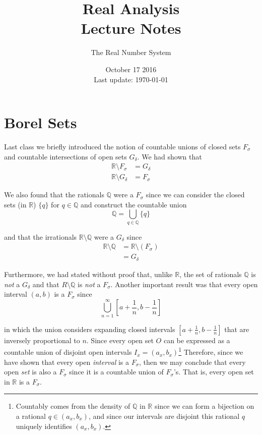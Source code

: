 \documentclass[12pt]{article}
\newlength\tindent
\renewcommand{\indent}{\hspace*{\tindent}}
\newcommand{\R}{\mathbb R}
\newcommand{\Q}{\mathbb Q}
\begin{document}
 
 
\title{Real Analysis\\Lecture Notes}
\author{The Real Number System}
\date{October 17 2016 \\ Last update: \today{}}
\maketitle

\section{Borel Sets}

\indent Last class we briefly introduced the notion of countable unions of closed sets $F_\sigma$ and countable intersections of open sets $G_\delta$. We had shown that
\begin{align*}
	\R \setminus F_\sigma &= G_\delta \\
	\R \setminus G_\delta &= F_\sigma
\end{align*}

\indent We also found that the rationals $\Q$ were a $F_\sigma$ since we can consider the closed sets (in $\R$) $\{q\}$ for $q \in \Q$ and construct the countable union
\begin{equation*}
	\Q = \bigcup_{q\in\Q} \{q\}
\end{equation*}

and that the irrationals $\R\setminus\Q$ were a $G_\delta$ since
\begin{align*}
	\R\setminus \Q &= \R \setminus (F_\sigma) \\
	&= G_\delta
\end{align*}

\indent Furthermore, we had stated without proof that, unlike $\R$, the set of rationals $\Q$ is {\em not} a $G_\delta$ and that $R\setminus\Q$ is {\em not} a $F_\sigma$. Another important result was that every open interval $(a, b)$ is a $F_\sigma$ since
\begin{equation*}
	\bigcup^\infty_{n = 1} \left[ a + \frac{1}{n}, b - \frac{1}{n} \right]
\end{equation*}

in which the union considers expanding closed intervals $\left[a + \frac{1}{n}, b - \frac{1}{n}\right]$ that are inversely proportional to $n$. Since every open set $O$ can be expressed as a countable union of disjoint open intervals $I_x = (a_x, b_x)$\footnote{Countably comes from the density of $\Q$ in $\R$ since we can form a bijection on a rational $q \in (a_x, b_x)$, and since our intervals are disjoint this rational $q$ uniquely identifies $(a_x, b_x)$.} Therefore, since we have shown that every open {\em interval} is a $F_\sigma$, then we may conclude that every open {\em set} is also a $F_\sigma$ since it is a countable union of $F_\sigma$'s. That is, every open set in $\R$ is a $F_\sigma$. \\
\end{document}
